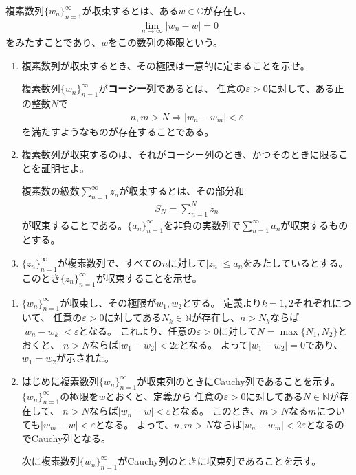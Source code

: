 \begin{renshu}
  複素数列$\{w_{n}\}_{n=1}^{\infty}$が収束するとは、ある$w\in\mathbb{C}$が存在し、
\begin{align}
    \lim_{n\to\infty}|w_{n}-w|=0
\end{align}
をみたすことであり、$w$をこの数列の極限という。
\begin{enumerate}
\item 複素数列が収束するとき、その極限は一意的に定まることを示せ。

複素数列$\{w_{n}\}_{n=1}^{\infty}$が\textbf{コーシー列}であるとは、
任意の$\varepsilon>0$に対して、ある正の整数$N$で
\begin{align}
n,m>N\Rightarrow|w_{n}-w_{m}|<\varepsilon
\end{align}
を満たすようなものが存在することである。
\item 複素数列が収束するのは、それがコーシー列のとき、かつそのときに限ることを証明せよ。

複素数の級数$\sum_{n=1}^{\infty}z_{n}$が収束するとは、その部分和
\begin{align}
S_{N}=\sum_{n=1}^{N}z_{n}
\end{align}
が収束することである。$\{a_{n}\}_{n=1}^{\infty}$を非負の実数列で$\sum_{n=1}^{\infty}a_{n}$が収束するものとする。
\item $\{z_{n}\}_{n=1}^{\infty}$が複素数列で、すべての$n$に対して$|z_{n}|\leq a_{n}$をみたしているとする。
このとき$\{z_{n}\}_{n=1}^{\infty}$が収束することを示せ。
\end{enumerate}
\end{renshu}

\begin{kaitou*}
\begin{enumerate}
\item $\{w_{n}\}_{n=1}^{\infty}$が収束し、その極限が$w_{1},w_{2}$とする。
定義より$k=1,2$それぞれについて、
任意の$\varepsilon>0$に対してある$N_{k}\in\mathbb{N}$が存在し、$n>N_{k}$ならば
$|w_{n}-w_{k}|<\varepsilon$となる。
これより、任意の$\varepsilon>0$に対して$N=\max\{N_{1},N_{2}\}$とおくと、
$n>N$ならば$|w_{1}-w_{2}|<2\varepsilon$となる。
よって$|w_{1}-w_{2}|=0$であり、$w_{1}=w_{2}$が示された。
\item はじめに複素数列$\{w_{n}\}_{n=1}^{\infty}$が収束列のときにCauchy列であることを示す。
$\{w_{n}\}_{n=1}^{\infty}$の極限を$w$とおくと、定義から
任意の$\varepsilon>0$に対してある$N\in\mathbb{N}$が存在して、
$n>N$ならば$|w_{n}-w|<\varepsilon$となる。
このとき、$m>N$なる$m$についても$|w_{m}-w|<\varepsilon$となる。
よって、$n,m>N$ならば$|w_{n}-w_{m}|<2\varepsilon$となるのでCauchy列となる。

次に複素数列$\{w_{n}\}_{n=1}^{\infty}$がCauchy列のときに収束列であることを示す。
\end{enumerate}
\end{kaitou*}